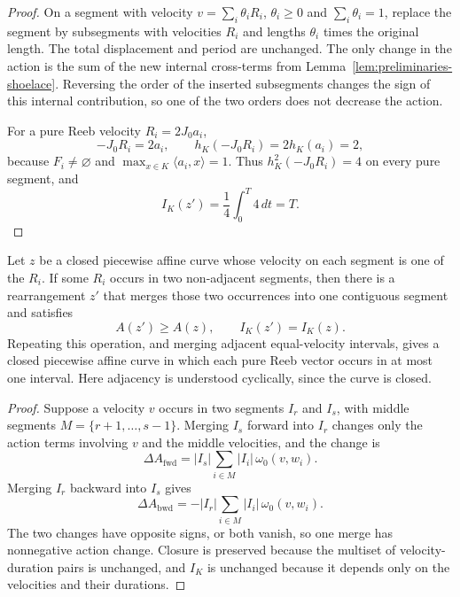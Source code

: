 \begin{proof}
On a segment with velocity \(v=\sum_i\theta_iR_i\), \(\theta_i\ge0\) and
\(\sum_i\theta_i=1\), replace the segment by subsegments with velocities
\(R_i\) and lengths \(\theta_i\) times the original length. The total
displacement and period are unchanged. The only change in the action is the
sum of the new internal cross-terms from
Lemma~\ref{lem:preliminaries-shoelace}. Reversing the order of the inserted
subsegments changes the sign of this internal contribution, so one of the two
orders does not decrease the action.

For a pure Reeb velocity \(R_i=2J_0a_i\),
\[
  -J_0R_i=2a_i,
  \qquad
  h_K(-J_0R_i)=2h_K(a_i)=2,
\]
because \(F_i\neq\varnothing\) and \(\max_{x\in K}\langle a_i,x\rangle=1\).
Thus \(h_K^2(-J_0R_i)=4\) on every pure segment, and
\[
  I_K(z')=\frac14\int_0^T4\,dt=T.
\]
\end{proof}

\begin{lemma}\label{lem:generalized-reeb-merging}
Let \(z\) be a closed piecewise affine curve whose velocity on each segment is
one of the \(R_i\). If some \(R_i\) occurs in two non-adjacent segments, then
there is a rearrangement \(z'\) that merges those two occurrences into one
contiguous segment and satisfies
\[
  A(z')\geq A(z),
  \qquad
  I_K(z')=I_K(z).
\]
Repeating this operation, and merging adjacent equal-velocity intervals,
gives a closed piecewise affine curve in which each pure Reeb vector occurs in
at most one interval. Here adjacency is understood cyclically, since the curve
is closed.
\end{lemma}

\begin{proof}
Suppose a velocity \(v\) occurs in two segments \(I_r\) and \(I_s\), with
middle segments \(M=\{r+1,\ldots,s-1\}\). Merging \(I_s\) forward into \(I_r\)
changes only the action terms involving \(v\) and the middle velocities, and
the change is
\[
  \Delta A_{\mathrm{fwd}}
  =
  |I_s|\sum_{i\in M}|I_i|\,\omega_0(v,w_i).
\]
Merging \(I_r\) backward into \(I_s\) gives
\[
  \Delta A_{\mathrm{bwd}}
  =
  -|I_r|\sum_{i\in M}|I_i|\,\omega_0(v,w_i).
\]
The two changes have opposite signs, or both vanish, so one merge has
nonnegative action change. Closure is preserved because the multiset of
velocity-duration pairs is unchanged, and \(I_K\) is unchanged because it
depends only on the velocities and their durations.
\end{proof}

